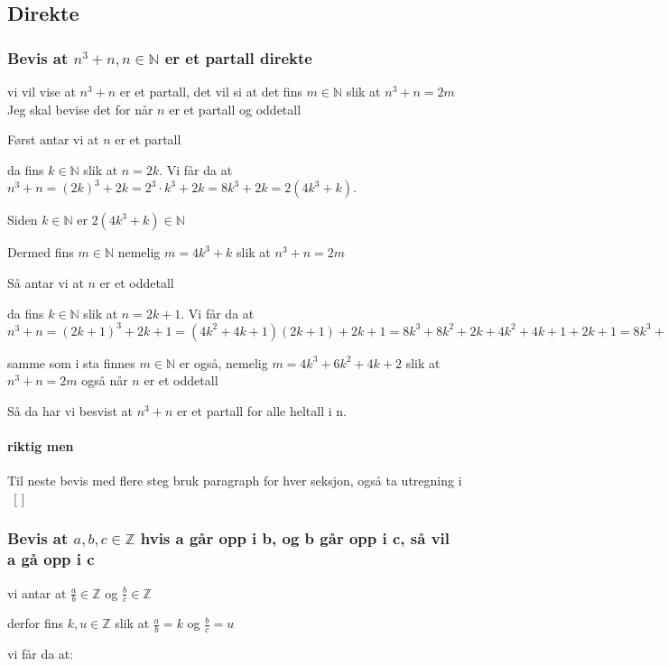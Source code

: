 \documentclass{article}
\begin{document}
\subsection{Direkte}

\subsubsection{Bevis at $n^3+n, n \in \mathbb{N}$ er et partall direkte}


vi vil vise at $n^3+n$ er et partall, det vil si at det fins $m \in \mathbb{N}$ slik at $n^3+n=2m$
Jeg skal bevise det for når $n$ er et partall og oddetall

Først antar vi at $n$ er et partall

da fins $k \in \mathbb{N}$ slik at $n=2k$. Vi får da at $n^3+n=(2k)^3+2k=2^3 \cdot k^3+2k=8k^3+2k=2(4k^3+k)$.

Siden $k \in \mathbb{N}$ er $2(4k^3+k) \in \mathbb{N}$

Dermed fins $m \in \mathbb{N}$ nemelig $m=4k^3+k$ slik at $n^3+n=2m$

Så antar vi at $n$ er et oddetall

da fins $k \in \mathbb{N}$ slik at $n=2k+1$. Vi får da at $n^3+n=(2k+1)^3+2k+1=(4k^2+4k+1)(2k+1)+2k+1=8k^3+8k^2+2k+4k^2+4k+1+2k+1=8k^3+12k^2+8k+2=2(4k^3+6k^2+4k+1)$

samme som i sta finnes $m \in \mathbb{N}$ er også, nemelig $m=4k^3+6k^2+4k+2$ slik at $n^3+n=2m$ også når $n$ er et oddetall

Så da har vi besvist at $n^3+n$ er et partall for alle heltall i n.

\paragraph{riktig men}

Til neste bevis med flere steg bruk paragraph for hver seksjon, også ta utregning i \ [ ] \

\subsubsection{Bevis at $a,b,c \in \mathbb{Z}$ hvis a går opp i b, og b går opp i c, så vil a gå opp i c }

vi antar at $\frac{a}{b} \in \mathbb{Z}$ og $\frac{b}{c} \in \mathbb{Z}$

derfor fins $k, u \in \mathbb{Z}$ slik at $\frac{a}{b}=k$ og $\frac{b}{c}=u$

vi får da at:
\end{document}

